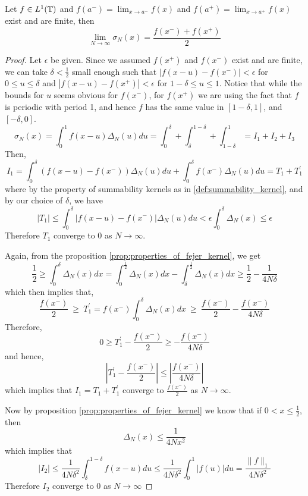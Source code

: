   \begin{theorem}
    \label{thm:fejer_theorem}
    Let $f \in L^1(\mathbb T)$ and $f(a^-) = \lim_{x \to a^-} f(x)$ and $f(a^+) = \lim_{x \to a^+} f(x)$ exist and are finite, then
    $$\lim_{ N\to \infty} \sigma_N(x) = \frac{f(x^-) + f(x^+)}{2}$$
  \end{theorem}

  \begin{proof}
    Let $\epsilon$ be given. Since we assumed $f(x^+)$ and $f(x^-)$ exist and are finite, we can take $\delta < \frac{1}{2}$ small enough such that $|f(x-u) - f(x^-)| < \epsilon$ for $0\le u \le \delta$ and $|f(x-u) - f(x^+)| < \epsilon$ for $1-\delta \le u \le 1$. Notice that while the bounds for $u$ seems obvious for $f(x^-)$, for $f(x^+)$ we are using the fact that $f$ is periodic with period 1, and hence $f$ has the same value in $[1-\delta, 1]$, and $[-\delta, 0]$.
    $$ \sigma_N(x) = \int_0^1 f(x-u)\Delta_N(u) du = \int_{0}^\delta + \int_\delta^{1-\delta} + \int_{1-\delta}^1 = I_1 + I_2 + I_3$$
    Then, 
    $$I_1 = \int_0^\delta (f(x-u) - f(x^-))\Delta_N(u)du + \int_0^\delta f(x^-)\Delta_N(u)du = T_1 + T_1^{'}$$
    where by the property of summability kernels as in \ref{def:summability_kernel}, and by our choice of $\delta$, we have
    $$|T_1| \le \int_0^\delta |f(x-u) - f(x^-)|\Delta_N(u)du < \epsilon \int_0^\delta \Delta_N(x) \le \epsilon$$
    Therefore $T_1$ converge to $0$ as $N \to \infty$.

    Again, from the proposition \ref{prop:properties_of_fejer_kernel}, we get
    $$\frac{1}{2} \ge \int_0^\delta \Delta_N(x) dx = \int_0^{\frac{1}{2}} \Delta_N(x) dx - \int_\delta^{\frac{1}{2}} \Delta_N(x) dx \ge \frac{1}{2} - \frac{1}{4N\delta}$$
    which then implies that, 
    $$\frac{f(x^-)}{2} \ \ge \ T_1^{'} = f(x^-)\int_0^\delta \Delta_N(x) dx \ \ge \ \frac{f(x^-)}{2} - \frac{f(x^-)}{4N\delta}  $$
    Therefore, 
    $$ 0\ge T_1^{'} - \frac{f(x^-)}{2} \ge -\frac{f(x^-)}{4N\delta} $$
    and hence, 
    $$\left| T_1^{'} - \frac{f(x^-)}{2}\right| \le \left|\frac{f(x^-)}{4N\delta}\right| $$
    which implies that $I_1 = T_1 + T_1^{'}$ converge to $\frac{f(x^-)}{2}$ as $N \to \infty$.

    Now by proposition \ref{prop:properties_of_fejer_kernel} we know that if $0 < x \le \frac{1}{2}$, then $$\Delta_N(x) \le \frac{1}{4Nx^2}$$ which implies that 
    $$ |I_2| \le \frac{1}{4N\delta^2}\int_\delta^{1-\delta}f(x-u) du \le \frac{1}{4N\delta^2}\int_0^1|f(u)|du = \frac{\|f\|_1}{4N\delta^2}$$
    Therefore $I_2$ converge to $0$ as $N \to \infty$


\end{proof}
